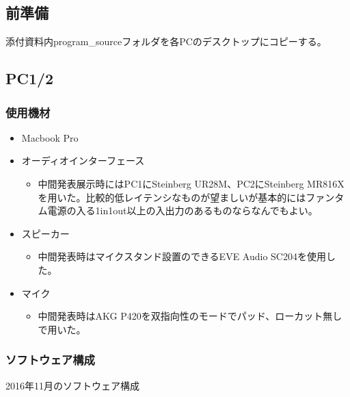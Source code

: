 \documentclass[a4paper]{jsarticle}
\begin{document}
\subsection{前準備}\label{ux524dux6e96ux5099}

添付資料内program\_sourceフォルダを各PCのデスクトップにコピーする。

\subsection{PC1/2}\label{pc12}

\subsubsection{使用機材}\label{ux4f7fux7528ux6a5fux6750}

\begin{itemize}
\tightlist
\item
  Macbook Pro
\item
  オーディオインターフェース

  \begin{itemize}
  \tightlist
  \item
    中間発表展示時にはPC1にSteinberg UR28M、PC2にSteinberg
    MR816Xを用いた。比較的低レイテンシなものが望ましいが基本的にはファンタム電源の入る1in1out以上の入出力のあるものならなんでもよい。
  \end{itemize}
\item
  スピーカー

  \begin{itemize}
  \tightlist
  \item
    中間発表時はマイクスタンド設置のできるEVE Audio SC204を使用した。
  \end{itemize}
\item
  マイク

  \begin{itemize}
  \tightlist
  \item
    中間発表時はAKG
    P420を双指向性のモードでパッド、ローカット無しで用いた。
  \end{itemize}
\end{itemize}

\subsubsection{ソフトウェア構成}\label{ux30bdux30d5ux30c8ux30a6ux30a7ux30a2ux69cbux6210}

2016年11月のソフトウェア構成
\end{document}
